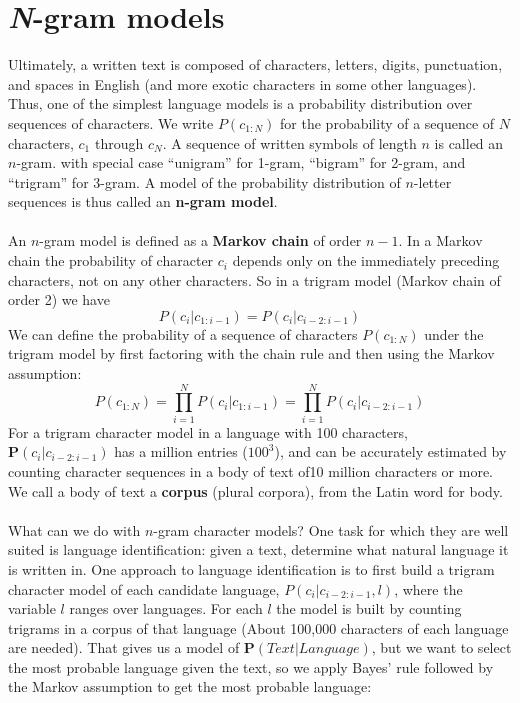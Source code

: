 \section{\textit{N}-gram models}
Ultimately, a written text is composed of characters, letters, digits, punctuation, and spaces in English (and more exotic characters in some other languages). Thus, one of the simplest language models is a probability distribution over sequences of characters. We write $P(c_{1:N})$ for the probability of a sequence of $N$ characters, $c_1$ through $c_N$. A sequence of written symbols of length $n$ is called an $n$-gram. with special case “unigram” for 1-gram, “bigram” for 2-gram, and “trigram” for 3-gram. A model of the probability distribution of $n$-letter sequences is thus called an \textbf{n-gram model}.\\\\
An $n$-gram model is defined as a \textbf{Markov chain} of order $n - 1$.  In a Markov chain the probability of character $c_i$ depends only on the immediately preceding characters, not on any other characters. So in a trigram model (Markov chain of order 2) we have
\[P(c_i | c_{1:i-1}) = P(c_i | c_{i-2:i-1})\]
We can define the probability of a sequence of characters $P(c_{1:N})$ under the trigram model by first factoring with the chain rule and then using the Markov assumption:
\[P(c_{1:N}) = \prod_{i=1}^N P(c_i | c_{1:i-1}) = \prod_{i=1}^N P(c_i | c_{i-2:i-1})\]
For a trigram character model in a language with 100 characters, $\textbf{P}(c_i | c_{i-2:i-1})$ has a million entries ($100^3$), and can be accurately estimated by counting character sequences in a body of text of10 million characters or more. We call a body of text a \textbf{corpus} (plural corpora), from the Latin word for body.\\\\
What can we do with $n$-gram character models? One task for which they are well suited is language identification: given a text, determine what natural language it is written in. One approach to language identification is to first build a trigram character model of each candidate language, $P(c_i | c_{i-2:i-1}, l)$, where the variable $l$ ranges over languages. For each $l$ the model is built by counting trigrams in a corpus of that language  (About 100,000 characters of each language are needed). That gives us a model of $\textbf{P}(Text | Language)$, but we want to select the most probable language given the text, so we apply Bayes’ rule followed by the Markov assumption to get the most probable language:
